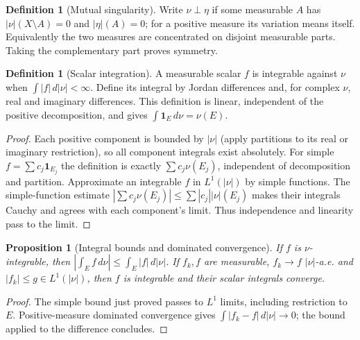 \documentclass[11pt,oneside,openany]{book}
\newtheorem{proposition}[theorem]{Proposition}
\theoremstyle{definition}
\newtheorem{definition}[theorem]{Definition}
\theoremstyle{remark}
\newcommand{\one}{\mathbf1}\newcommand{\ind}[1]{\mathbf1_{#1}}
\newcommand{\family}[1]{}
\begin{document}
\begin{definition}[Mutual singularity]\family{D11.14.mutual_singularity}\label{d11:14:mutual-singularity}
Write $\nu\perp\eta$ if some measurable $A$ has
$|\nu|(X\setminus A)=0$ and $|\eta|(A)=0$; for a positive measure its
variation means itself. Equivalently the two measures are concentrated on
disjoint measurable parts. Taking the complementary part proves symmetry.
\end{definition}

\begin{definition}[Scalar integration]\family{D11.14.scalar_integration}\label{d11:14:scalar-integration}
A measurable scalar $f$ is integrable against $\nu$ when
$\int|f|\,d|\nu|<\infty$. Define its integral by Jordan differences and,
for complex $\nu$, real and imaginary differences. This definition is linear,
independent of the positive decomposition, and gives
$\int\one_E\,d\nu=\nu(E)$.
\end{definition}
\begin{proof}
Each positive component is bounded by $|\nu|$ (apply partitions to its real
or imaginary restriction), so all component integrals exist absolutely.
For simple $f=\sum c_j\one_{E_j}$ the definition is exactly
$\sum c_j\nu(E_j)$, independent of decomposition and partition. Approximate
an integrable $f$ in $L^1(|\nu|)$ by simple functions. The simple-function
estimate $|\sum c_j\nu(E_j)|\leq\sum|c_j||\nu|(E_j)$ makes their integrals
Cauchy and agrees with each component's limit. Thus independence and
linearity pass to the limit.
\end{proof}

\begin{proposition}[Integral bounds and dominated convergence]\family{D11.14.integral_variation_bound}\label{d11:14:integral-variation-bound}
If $f$ is $\nu$-integrable, then
$|\int_E f\,d\nu|\leq\int_E|f|\,d|\nu|$. If $f_k,f$ are measurable,
$f_k\to f$ $|\nu|$-a.e.
and $|f_k|\leq g\in L^1(|\nu|)$, then $f$ is integrable and their scalar
integrals converge.
\end{proposition}
\begin{proof}
The simple bound just proved passes to $L^1$ limits, including restriction
to $E$. Positive-measure dominated convergence gives
$\int|f_k-f|\,d|\nu|\to0$; the bound applied to the difference concludes.
\end{proof}
\end{document}
